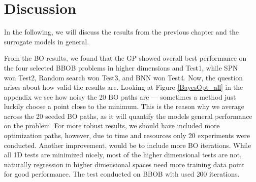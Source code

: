 \chapter{Discussion}
In the following, we will discuss the results from the previous chapter and the
surrogate models in general. 

From the BO results, we found that the GP showed overall best performance on the four selected BBOB problems
in higher dimensions and Test1, while SPN won Test2, Random search won Test3, and BNN won Test4. Now, 
the question arises about how valid the results are. Looking at Figure \ref{BayesOpt_all} in the appendix
we see how noisy the 20 BO paths are --- sometimes a method just luckily choose a point close to the minimum. 
This is the reason why we average across the 20 seeded BO paths, as it will quantify the models general performance
on the problem. For more robust results, we should have included more optimization paths, however, due to time and resources
only 20 experiments were conducted. Another improvement, would be to include more BO iterations. While all 1D tests 
are minimized nicely, most of the higher dimensional tests are not, naturally regression in higher dimensional spaces
need more training data point for good performance. The test conducted on BBOB with \cite{PhDthesis} used 200 iterations. 

